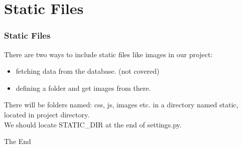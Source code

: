 \documentclass{beamer}
\begin{document}
\section{Static Files}

\begin{frame}
	\frametitle{Static Files}
	There are two ways to include static files like images in our project:
	\begin{itemize}
		\item fetching data from the database. (not covered)
		\item defining a folder and get images from there.
	\end{itemize}
	There will be folders named: css, js, images etc. in a directory named static, located in project directory.
	\\We should locate STATIC\_DIR at the end of settings.py.
\end{frame}

\begin{frame}
\Huge{\centerline{The End}}
\end{frame}
\end{document}
